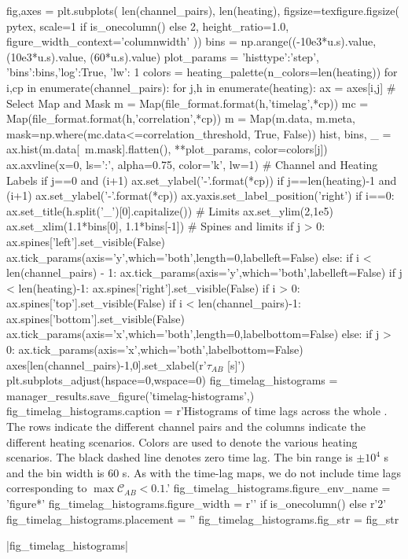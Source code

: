 \begin{pycode}
fig,axes = plt.subplots(
    len(channel_pairs), len(heating),
    figsize=texfigure.figsize(
        pytex,
        scale=1 if is_onecolumn() else 2,
        height_ratio=1.0,
        figure_width_context='columnwidth'
))
bins = np.arange((-10e3*u.s).value, (10e3*u.s).value, (60*u.s).value)
plot_params = {'histtype':'step', 'bins':bins,'log':True,
                'lw': 1}
colors = heating_palette(n_colors=len(heating))
for i,cp in enumerate(channel_pairs):
    for j,h in enumerate(heating):
        ax = axes[i,j]
        # Select Map and Mask
        m = Map(file_format.format(h,'timelag',*cp))
        mc = Map(file_format.format(h,'correlation',*cp))
        m = Map(m.data, m.meta, mask=np.where(mc.data<=correlation_threshold, True, False))
        hist, bins, _ = ax.hist(m.data[~m.mask].flatten(), **plot_params, color=colors[j])
        ax.axvline(x=0, ls=':', alpha=0.75, color='k', lw=1)
        # Channel and Heating Labels
        if j==0 and (i+1)%
            ax.set_ylabel('{}-{}'.format(*cp))
        if j==len(heating)-1 and (i+1)%
            ax.set_ylabel('{}-{}'.format(*cp))
            ax.yaxis.set_label_position('right')
        if i==0:
            ax.set_title(h.split('_')[0].capitalize())
        # Limits
        ax.set_ylim(2,1e5)
        ax.set_xlim(1.1*bins[0], 1.1*bins[-1])
        # Spines and limits
        if j > 0:
            ax.spines['left'].set_visible(False)
            ax.tick_params(axis='y',which='both',length=0,labelleft=False)
        else:
            if i < len(channel_pairs) - 1:
                ax.tick_params(axis='y',which='both',labelleft=False)
        if j < len(heating)-1:
            ax.spines['right'].set_visible(False)
        if i > 0:
            ax.spines['top'].set_visible(False)
        if i < len(channel_pairs)-1:
            ax.spines['bottom'].set_visible(False)
            ax.tick_params(axis='x',which='both',length=0,labelbottom=False)
        else:
            if j > 0:
                ax.tick_params(axis='x',which='both',labelbottom=False)
axes[len(channel_pairs)-1,0].set_xlabel(r'$\tau_{AB}$ [s]')
plt.subplots_adjust(hspace=0,wspace=0)
fig_timelag_histograms = manager_results.save_figure('timelag-histograms',)
fig_timelag_histograms.caption = r'Histograms of time lags across the whole \AR{}. The rows indicate the different channel pairs and the columns indicate the different heating scenarios. Colors are used to denote the various heating scenarios. The black dashed line denotes zero time lag. The bin range is $\pm10^4$ s and the bin width is 60 s. As with the time-lag maps, we do not include time lags corresponding to $\max{\mathcal{C}_{AB}}<0.1$.'
fig_timelag_histograms.figure_env_name = 'figure*'
fig_timelag_histograms.figure_width = r'\columnwidth' if is_onecolumn() else r'2\columnwidth'
fig_timelag_histograms.placement = ''
fig_timelag_histograms.fig_str = fig_str
\end{pycode}
|fig_timelag_histograms|

